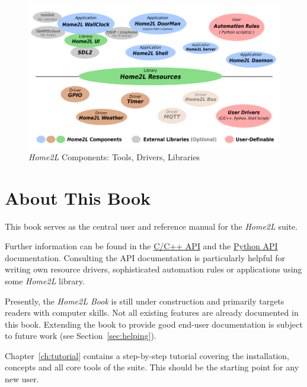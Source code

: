 \documentclass[12pt,english,parskip=half]{scrreprt}
\newcommand{\figfile}[2]{#2}             %
\newcommand{\figfile}[2]{\href{#1}{#2}}  %
\newcommand{\projecturl}{}
\newcommand{\docref}[2]{\href{\projecturl#1}{#2}}
\newcommand{\refapipython}{\docref{home2l-api_python/index.html}{Python API}}
\newcommand{\refapic}{\docref{home2l-api_c/index.html}{C/C++ API}}
\begin{document}
\begin{figure}[ht]
  \centering
  \figfile{figs/home2l-components.svg}{
    \includegraphics[width=0.9\linewidth,keepaspectratio]{figs/home2l-components}   %
  }
  \caption[l]{\emph{Home2L} Components:
    \textcolor[rgb]{0.2,0.3,1.0}{Tools},
    \textcolor[rgb]{0.5,0.25,0}{Drivers},
    \textcolor[rgb]{0,0.5,0}{Libraries}
  }
  \label{fig:home2l-components}
\end{figure}




\section{About This Book}
\label{sec:intro-about}

This book serves as the central user and reference manual for the \emph{Home2L} suite.

Further information can be found in the \refapic{} and the \refapipython{} documentation.
Consulting the API documentation is particularly helpful for writing own resource drivers,
sophisticated automation rules or applications using some \emph{Home2L} library.

Presently, the \textit{Home2L Book} is still under construction and primarily targets readers with computer skills. Not all existing features are already documented in this book.
Extending the book to provide good end-user documentation is subject to future work
(see Section~\ref{sec:helping}).

Chapter~\ref{ch:tutorial} contains a step-by-step tutorial covering the installation,
concepts and all core tools of the suite. This should be the starting point for any new user.
\end{document}
